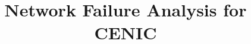 \documentclass[conference, twocolumn, oneside, 10pt]{IEEEtran}
\begin{document}
%
\title{Network Failure Analysis for CENIC}


\author{
\IEEEauthorblockN{ }
\and
\IEEEauthorblockN{ }
\and
\IEEEauthorblockN{ }
}



% 
\end{document}
